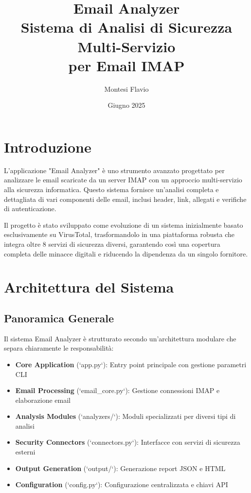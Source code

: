 \documentclass{article}
\title{Email Analyzer\\Sistema di Analisi di Sicurezza Multi-Servizio\\per Email IMAP}
\author{Montesi Flavio}
\date{Giugno 2025}
\begin{document}
\maketitle 
\tableofcontents
\newpage

\section{Introduzione}

L'applicazione "Email Analyzer" è uno strumento avanzato progettato per analizzare le email scaricate da un server IMAP con un approccio multi-servizio alla sicurezza informatica. Questo sistema fornisce un'analisi completa e dettagliata di vari componenti delle email, inclusi header, link, allegati e verifiche di autenticazione.

Il progetto è stato sviluppato come evoluzione di un sistema inizialmente basato esclusivamente su VirusTotal, trasformandolo in una piattaforma robusta che integra oltre 8 servizi di sicurezza diversi, garantendo così una copertura completa delle minacce digitali e riducendo la dipendenza da un singolo fornitore.

\section{Architettura del Sistema}

\subsection{Panoramica Generale}

Il sistema Email Analyzer è strutturato secondo un'architettura modulare che separa chiaramente le responsabilità:

\begin{itemize}
    \item \textbf{Core Application} (`app.py`): Entry point principale con gestione parametri CLI
    \item \textbf{Email Processing} (`email\_core.py`): Gestione connessioni IMAP e elaborazione email
    \item \textbf{Analysis Modules} (`analyzers/`): Moduli specializzati per diversi tipi di analisi
    \item \textbf{Security Connectors} (`connectors.py`): Interfacce con servizi di sicurezza esterni
    \item \textbf{Output Generation} (`output/`): Generazione report JSON e HTML
    \item \textbf{Configuration} (`config.py`): Configurazione centralizzata e chiavi API
\end{itemize}
\end{document}
